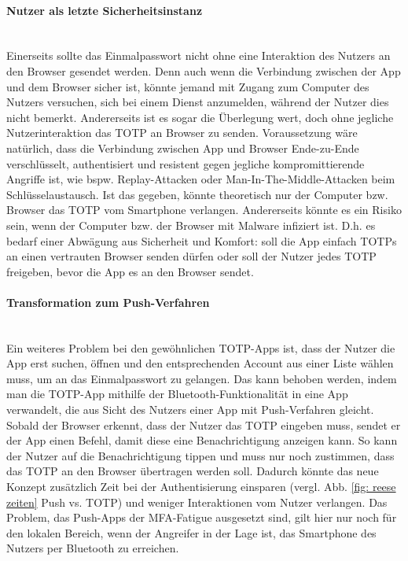 \paragraph*{Nutzer als letzte Sicherheitsinstanz}
\mbox{} \vspace{0.1cm} \\
Einerseits sollte das Einmalpasswort nicht ohne eine Interaktion des Nutzers an 
den Browser gesendet werden. Denn auch wenn die Verbindung zwischen der App und 
dem Browser sicher ist, könnte jemand mit Zugang zum Computer des Nutzers 
versuchen, sich bei einem Dienst anzumelden, während der Nutzer dies nicht 
bemerkt. Andererseits ist es sogar die Überlegung wert, doch ohne jegliche 
Nutzerinteraktion das TOTP an Browser zu senden. Voraussetzung wäre natürlich, 
dass die Verbindung zwischen App und Browser Ende-zu-Ende verschlüsselt, 
authentisiert und resistent gegen jegliche kompromittierende Angriffe ist, wie 
bspw. Replay-Attacken oder Man-In-The-Middle-Attacken beim Schlüsselaustausch. 
Ist das gegeben, könnte theoretisch nur der Computer bzw. Browser das TOTP vom 
Smartphone verlangen. Andererseits könnte es ein Risiko sein, wenn der Computer 
bzw. der Browser mit Malware infiziert ist. D.h. es bedarf einer Abwägung aus Sicherheit und Komfort: soll die App einfach TOTPs an einen vertrauten Browser senden dürfen oder soll der Nutzer jedes TOTP freigeben, bevor die App es an den Browser sendet.

\paragraph*{Transformation zum Push-Verfahren}
\mbox{} \vspace{0.1cm} \\
Ein weiteres Problem bei den gewöhnlichen TOTP-Apps ist, dass der Nutzer die App 
erst suchen, öffnen und den entsprechenden Account aus einer Liste wählen muss, 
um an das Einmalpasswort zu gelangen. Das kann behoben werden, indem man die 
TOTP-App mithilfe der Bluetooth-Funktionalität in eine App verwandelt, die aus 
Sicht des Nutzers einer App mit Push-Verfahren gleicht. Sobald der Browser 
erkennt, dass der Nutzer das TOTP eingeben muss, sendet er der App einen Befehl, 
damit diese eine Benachrichtigung anzeigen kann. So kann der Nutzer auf die 
Benachrichtigung tippen und muss nur noch zustimmen, dass das TOTP an den Browser 
übertragen werden soll. Dadurch könnte das neue Konzept zusätzlich Zeit bei der 
Authentisierung einsparen  (vergl. Abb. \ref{fig: reese zeiten} Push vs. 
TOTP) und weniger Interaktionen vom Nutzer verlangen. Das Problem, das Push-Apps der MFA-Fatigue ausgesetzt sind, gilt hier nur noch für den lokalen Bereich, wenn der Angreifer in der Lage ist, das Smartphone des Nutzers per Bluetooth zu erreichen.

